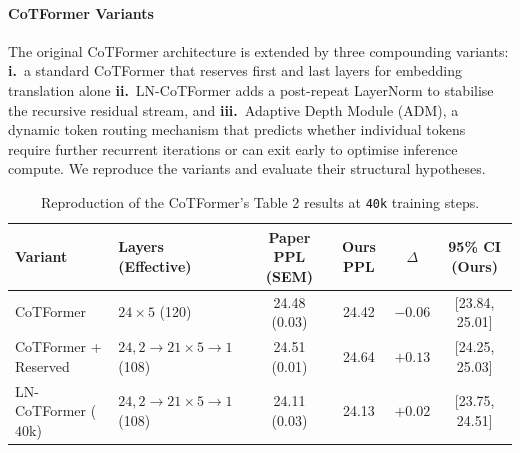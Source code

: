 \documentclass[10pt]{article}
\begin{document}
\paragraph{CoTFormer Variants} The original CoTFormer architecture is extended by three compounding variants: \textbf{i.}~a standard CoTFormer that reserves first and last layers for embedding translation alone \textbf{ii.}~LN-CoTFormer adds a post-repeat LayerNorm to stabilise the recursive residual stream, and \textbf{iii.}~Adaptive Depth Module (ADM), a dynamic token routing mechanism that predicts whether individual tokens require further recurrent iterations or can exit early to optimise inference compute. We reproduce the variants and evaluate their structural hypotheses.
\begin{table}[!ht]
\centering
\small
\setlength{\tabcolsep}{1.0pt}
\begin{tabular}{llcccc}
\toprule
\textbf{Variant} & \textbf{Layers (Effective)} & \textbf{Paper PPL (SEM)} & \textbf{Ours PPL} & $\Delta$ & \textbf{95\% CI (Ours)} \\ 
\midrule
CoTFormer & $24\times5$ (120) & 24.48 (0.03) & 24.42 & $-0.06$ & [23.84, 25.01] \\
CoTFormer + Reserved & $24, 2\rightarrow21\times5\rightarrow1$ (108) & 24.51 (0.01) & 24.64 & $+0.13$ & [24.25, 25.03] \\
LN-CoTFormer ($40$k) & $24, 2\rightarrow21\times5\rightarrow1$ (108) & 24.11 (0.03) & 24.13 & $+0.02$ & [23.75, 24.51] \\ 
\bottomrule
\end{tabular}
\caption{Reproduction of the CoTFormer's Table 2 results at \texttt{40k} training steps.}
\label{tab:table2-repro}
\end{table}
\end{document}
